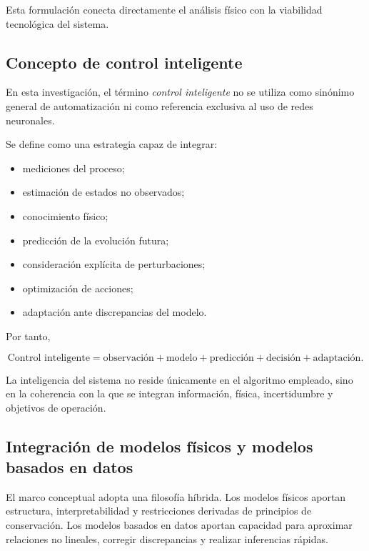 Esta formulación conecta directamente el análisis físico con la viabilidad tecnológica del sistema.

\subsection{Concepto de control inteligente}
\label{subsec:concepto_control_inteligente}

En esta investigación, el término \textit{control inteligente} no se utiliza como sinónimo general de automatización ni como referencia exclusiva al uso de redes neuronales.

Se define como una estrategia capaz de integrar:

\begin{itemize}
    \item mediciones del proceso;
    \item estimación de estados no observados;
    \item conocimiento físico;
    \item predicción de la evolución futura;
    \item consideración explícita de perturbaciones;
    \item optimización de acciones;
    \item adaptación ante discrepancias del modelo.
\end{itemize}

Por tanto,

\begin{equation}
\boxed{
\text{Control inteligente}
=
\text{observación}
+
\text{modelo}
+
\text{predicción}
+
\text{decisión}
+
\text{adaptación}.
}
\label{eq:definicion_control_inteligente}
\end{equation}

La inteligencia del sistema no reside únicamente en el algoritmo empleado, sino en la coherencia con la que se integran información, física, incertidumbre y objetivos de operación.

\subsection{Integración de modelos físicos y modelos basados en datos}
\label{subsec:integracion_fisica_datos}

El marco conceptual adopta una filosofía híbrida. Los modelos físicos aportan estructura, interpretabilidad y restricciones derivadas de principios de conservación. Los modelos basados en datos aportan capacidad para aproximar relaciones no lineales, corregir discrepancias y realizar inferencias rápidas.

